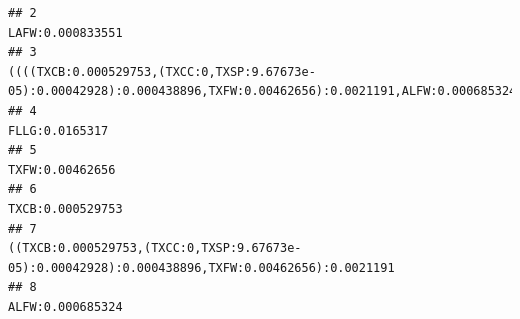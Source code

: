 \documentclass[]{article}
\begin{document}
\begin{verbatim}
## 2                                                                                                                                                                                                                                                                                                                                                                                                 LAFW:0.000833551
## 3                                                                                                                                                                                                                                                    ((((TXCB:0.000529753,(TXCC:0,TXSP:9.67673e-05):0.00042928):0.000438896,TXFW:0.00462656):0.0021191,ALFW:0.000685324):0.000140543,LAFW:0.000833551):0.000556541
## 4                                                                                                                                                                                                                                                                                                                                                                                                   FLLG:0.0165317
## 5                                                                                                                                                                                                                                                                                                                                                                                                  TXFW:0.00462656
## 6                                                                                                                                                                                                                                                                                                                                                                                                 TXCB:0.000529753
## 7                                                                                                                                                                                                                                                                                                                  ((TXCB:0.000529753,(TXCC:0,TXSP:9.67673e-05):0.00042928):0.000438896,TXFW:0.00462656):0.0021191
## 8                                                                                                                                                                                                                                                                                                                                                                                                 ALFW:0.000685324

\end{verbatim}
\end{document}
